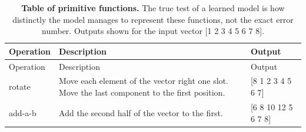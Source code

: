 \documentclass[12pt,twoside]{mitthesis}
\begin{document}
\begin{longtable}[c]{@{}lll@{}}
\caption{\label{tbl:primitives}\textbf{Table of primitive functions.}
The true test of a learned model is how distinctly the model manages to
represent these functions, not the exact error number. Outputs shown for
the input vector {[}1 2 3 4 5 6 7 8{]}. }\tabularnewline
\toprule
\begin{minipage}[b]{0.14\columnwidth}\raggedright\strut
Operation
\strut\end{minipage} &
\begin{minipage}[b]{0.55\columnwidth}\raggedright\strut
Description
\strut\end{minipage} &
\begin{minipage}[b]{0.22\columnwidth}\raggedright\strut
Output
\strut\end{minipage}\tabularnewline
\midrule
\endfirsthead
\toprule
\begin{minipage}[b]{0.14\columnwidth}\raggedright\strut
Operation
\strut\end{minipage} &
\begin{minipage}[b]{0.55\columnwidth}\raggedright\strut
Description
\strut\end{minipage} &
\begin{minipage}[b]{0.22\columnwidth}\raggedright\strut
Output
\strut\end{minipage}\tabularnewline
\midrule
\endhead
\begin{minipage}[t]{0.14\columnwidth}\raggedright\strut
rotate
\strut\end{minipage} &
\begin{minipage}[t]{0.55\columnwidth}\raggedright\strut
Move each element of the vector right one slot. Move the last component
to the first position.
\strut\end{minipage} &
\begin{minipage}[t]{0.22\columnwidth}\raggedright\strut
{[}8 1 2 3 4 5 6 7{]}
\strut\end{minipage}\tabularnewline
\begin{minipage}[t]{0.14\columnwidth}\raggedright\strut
add-a-b
\strut\end{minipage} &
\begin{minipage}[t]{0.55\columnwidth}\raggedright\strut
Add the second half of the vector to the first.
\strut\end{minipage} &
\begin{minipage}[t]{0.22\columnwidth}\raggedright\strut
{[}6 8 10 12 5 6 7 8{]}
\strut\end{minipage}\tabularnewline

\end{longtable}
\end{document}
